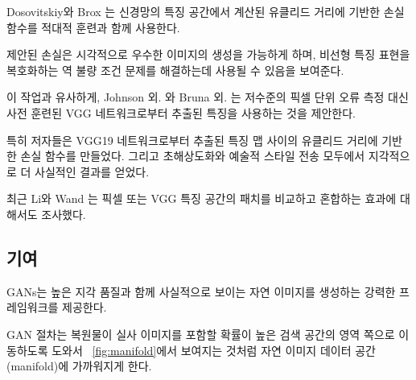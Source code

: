 \documentclass[10pt,twocolumn,letterpaper]{article}
\newcommand{\kor}[1]{#1}
\newcommand{\eng}[1]{}
\begin{document}
\eng{
Dosovitskiy and Brox \cite{dosovitskiy2016generating} use loss functions based on Euclidean distances computed in the feature space of neural networks in combination with adversarial training.
}\kor{
Dosovitskiy와 Brox \cite{dosovitskiy2016generating}는 신경망의 특징 공간에서 계산된 유클리드 거리에 기반한 손실 함수를 적대적 훈련과 함께 사용한다.
} \eng{
It is shown that the proposed loss allows visually superior image generation and can be used to solve the ill-posed inverse problem of decoding nonlinear feature representations.
}\kor{
제안된 손실은 시각적으로 우수한 이미지의 생성을 가능하게 하며, 비선형 특징 표현을 복호화하는 역 불량 조건 문제를 해결하는데 사용될 수 있음을 보여준다.
}
\eng{
Similar to this work, Johnson et al. \cite{Johnson16PercepLoss} and Bruna et al. \cite{bruna2016super} propose the use of features extracted from a pre-trained VGG network instead of low-level pixel-wise error measures.
}\kor{
이 작업과 유사하게, Johnson 외. \cite{Johnson16PercepLoss}와 Bruna 외. \cite{bruna2016super}는 저수준의 픽셀 단위 오류 측정 대신 사전 훈련된 VGG 네트워크로부터 추출된 특징을 사용하는 것을 제안한다.
} \eng{
Specifically the authors formulate a loss function based on the euclidean distance between feature maps extracted from the VGG19 \cite{simonyan2014very} network. Perceptually more convincing results were obtained for both super-resolution and artistic style-transfer \cite{Gatys2015nips,Gatys2016cvpr}.
}\kor{
특히 저자들은 VGG19 \cite{simonyan2014very} 네트워크로부터 추출된 특징 맵 사이의 유클리드 거리에 기반한 손실 함수를 만들었다. 그리고 초해상도화와 예술적 스타일 전송 \cite{Gatys2015nips,Gatys2016cvpr} 모두에서 지각적으로 더 사실적인 결과를 얻었다.
} \eng{
Recently, Li and Wand \cite{Li2016} also investigated the effect of comparing and blending patches in pixel or VGG feature space.
}\kor{
최근 Li와 Wand \cite{Li2016}는 픽셀 또는 VGG 특징 공간의 패치를 비교하고 혼합하는 효과에 대해서도 조사했다.
}

\subsection{\eng{Contribution}\kor{기여}}
\eng{
\acp{GAN} provide a powerful framework for generating plausible-looking natural images with high perceptual quality.
}\kor{
\acp{GAN}는 높은 지각 품질과 함께 사실적으로 보이는 자연 이미지를 생성하는 강력한 프레임워크를 제공한다.
}
\eng{
The \ac{GAN} procedure encourages the reconstructions to move towards regions of the search space with high probability of containing photo-realistic images and thus closer to the natural image manifold as shown in \figurename~\ref{fig:manifold}.
}\kor{
GAN 절차는 복원물이 실사 이미지를 포함할 확률이 높은 검색 공간의 영역 쪽으로 이동하도록 도와서 \figurename~\ref{fig:manifold}에서 보여지는 것처럼 자연 이미지 데이터 공간(manifold)에 가까워지게 한다.
}
\end{document}

